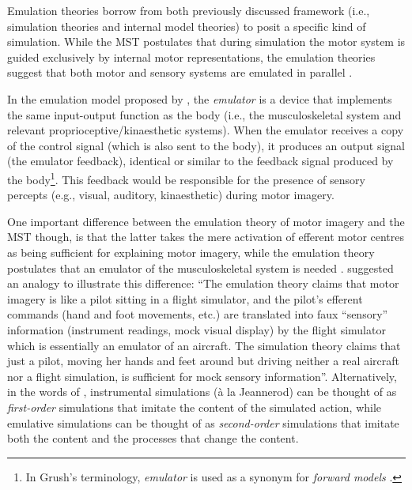 \documentclass[a4paper,12pt,oneside,oldfontcommands]{memoir}
\let\rmarkdownfootnote\footnote%
\def\footnote{\protect\rmarkdownfootnote}
\begin{document}
Emulation theories
\citep[e.g.,][]{grush_emulation_2004, moulton_imagining_2009} borrow
from both previously discussed framework (i.e., simulation theories and
internal model theories) to posit a specific kind of simulation. While
the MST postulates that during simulation the motor system is guided
exclusively by internal motor representations, the emulation theories
suggest that both motor and sensory systems are emulated in parallel
\citep{grush_emulation_2004, oshea_does_2017}.

In the emulation model proposed by \citet{grush_emulation_2004}, the
\emph{emulator} is a device that implements the same input-output
function as the body (i.e., the musculoskeletal system and relevant
proprioceptive/kinaesthetic systems). When the emulator receives a copy
of the control signal (which is also sent to the body), it produces an
output signal (the emulator feedback), identical or similar to the
feedback signal produced by the body\footnote{In Grush's terminology,
  \emph{emulator} is used as a synonym for \emph{forward models}
  \citep[see][pages 378-379]{grush_emulation_2004}.}. This feedback
would be responsible for the presence of sensory percepts (e.g., visual,
auditory, kinaesthetic) during motor imagery.

One important difference between the emulation theory of motor imagery
and the MST though, is that the latter takes the mere activation of
efferent motor centres as being sufficient for explaining motor imagery,
while the emulation theory postulates that an emulator of the
musculoskeletal system is needed \citep[pages
384-385]{grush_emulation_2004}. \citet{grush_emulation_2004} suggested
an analogy to illustrate this difference: ``The emulation theory claims
that motor imagery is like a pilot sitting in a flight simulator, and
the pilot's efferent commands (hand and foot movements, etc.) are
translated into faux ``sensory'' information (instrument readings, mock
visual display) by the flight simulator which is essentially an emulator
of an aircraft. The simulation theory claims that just a pilot, moving
her hands and feet around but driving neither a real aircraft nor a
flight simulation, is sufficient for mock sensory information''.
Alternatively, in the words of \citet{moulton_imagining_2009},
instrumental simulations (à la Jeannerod) can be thought of as
\emph{first-order} simulations that imitate the content of the simulated
action, while emulative simulations can be thought of as
\emph{second-order} simulations that imitate both the content and the
processes that change the content.
\end{document}
